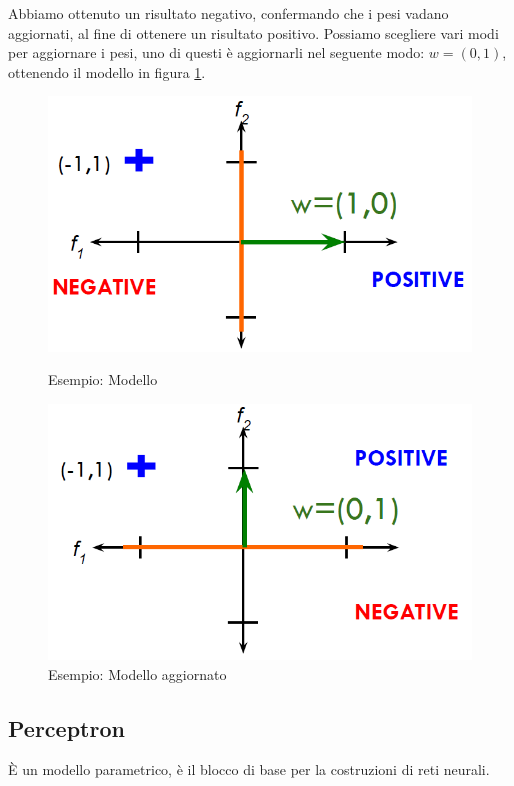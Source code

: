 	Abbiamo ottenuto un risultato negativo, confermando che i pesi vadano aggiornati, al fine di ottenere un risultato positivo. 
	Possiamo scegliere vari modi per aggiornare i pesi, uno di questi \`e aggiornarli nel seguente modo: $w=(0,1)$, ottenendo il modello in figura \ref{fig:chapter04-03}.
	
	\begin{figure}
		\centering
		\begin{minipage}{.5\textwidth}
			\centering
			\includegraphics[width=1\linewidth]{imgs/chapter4/img2}
			\caption{Esempio: Modello}
			\label{fig:chapter04-02}
		\end{minipage}%
		\begin{minipage}{.5\textwidth}
			\centering
			\includegraphics[width=1\linewidth]{imgs/chapter4/img3}
			\caption{Esempio: Modello aggiornato}
			\label{fig:chapter04-03}
		\end{minipage}
	\end{figure}
	
	\subsection{Perceptron}
	\`E un modello parametrico, \`e il blocco di base per la costruzioni di reti neurali.
